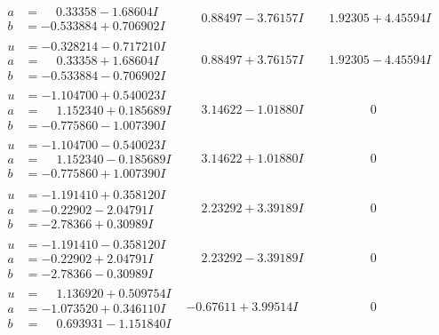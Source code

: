 \documentclass[1p]{elsarticle_modified}
\theoremstyle{definition}
\begin{document}
$$\begin{array}{c|c|c}
\begin{aligned}
a &= \phantom{-}0.33358 - 1.68604 I \\
b &= -0.533884 + 0.706902 I\end{aligned}
 & \phantom{-}0.88497 - 3.76157 I & \phantom{-}1.92305 + 4.45594 I \\ \hline\begin{aligned}
u &= -0.328214 - 0.717210 I \\
a &= \phantom{-}0.33358 + 1.68604 I \\
b &= -0.533884 - 0.706902 I\end{aligned}
 & \phantom{-}0.88497 + 3.76157 I & \phantom{-}1.92305 - 4.45594 I \\ \hline\begin{aligned}
u &= -1.104700 + 0.540023 I \\
a &= \phantom{-}1.152340 + 0.185689 I \\
b &= -0.775860 - 1.007390 I\end{aligned}
 & \phantom{-}3.14622 - 1.01880 I & \phantom{-0.000000 } 0 \\ \hline\begin{aligned}
u &= -1.104700 - 0.540023 I \\
a &= \phantom{-}1.152340 - 0.185689 I \\
b &= -0.775860 + 1.007390 I\end{aligned}
 & \phantom{-}3.14622 + 1.01880 I & \phantom{-0.000000 } 0 \\ \hline\begin{aligned}
u &= -1.191410 + 0.358120 I \\
a &= -0.22902 - 2.04791 I \\
b &= -2.78366 + 0.30989 I\end{aligned}
 & \phantom{-}2.23292 + 3.39189 I & \phantom{-0.000000 } 0 \\ \hline\begin{aligned}
u &= -1.191410 - 0.358120 I \\
a &= -0.22902 + 2.04791 I \\
b &= -2.78366 - 0.30989 I\end{aligned}
 & \phantom{-}2.23292 - 3.39189 I & \phantom{-0.000000 } 0 \\ \hline\begin{aligned}
u &= \phantom{-}1.136920 + 0.509754 I \\
a &= -1.073520 + 0.346110 I \\
b &= \phantom{-}0.693931 - 1.151840 I\end{aligned}
 & -0.67611 + 3.99514 I & \phantom{-0.000000 } 0 \\ \hline\begin{aligned}

\end{aligned}
\end{array}$$
\end{document}

